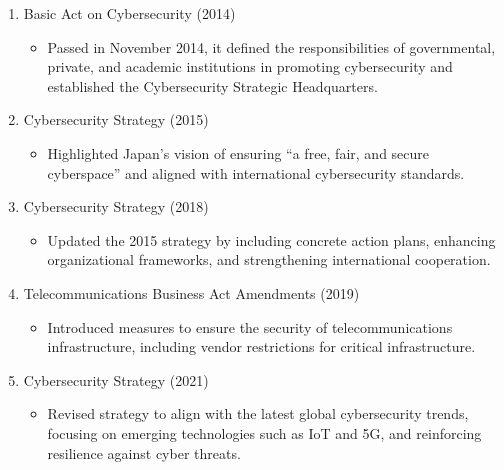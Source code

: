 \begin{enumerate}
\begin{description}
\begin{enumerate}[label=\arabic*.]
\begin{itemize}
			\end{itemize}
			\item Basic Act on Cybersecurity (2014)
			\begin{itemize}
				\item Passed in November 2014, it defined the responsibilities of governmental, private, and academic institutions in promoting cybersecurity and established the Cybersecurity Strategic Headquarters.
			\end{itemize}
			\item Cybersecurity Strategy (2015)
			\begin{itemize}
				\item Highlighted Japan’s vision of ensuring “a free, fair, and secure cyberspace” and aligned with international cybersecurity standards.
			\end{itemize}
			\item Cybersecurity Strategy (2018)
			\begin{itemize}
				\item Updated the 2015 strategy by including concrete action plans, enhancing organizational frameworks, and strengthening international cooperation.
			\end{itemize}
			\item Telecommunications Business Act Amendments (2019)
			\begin{itemize}
				\item Introduced measures to ensure the security of telecommunications infrastructure, including vendor restrictions for critical infrastructure.
			\end{itemize}
			\item Cybersecurity Strategy (2021)
			\begin{itemize}
				\item Revised strategy to align with the latest global cybersecurity trends, focusing on emerging technologies such as IoT and 5G, and reinforcing resilience against cyber threats.
			\end{itemize}
        \end{enumerate}
    \end{description}


\end{enumerate}
